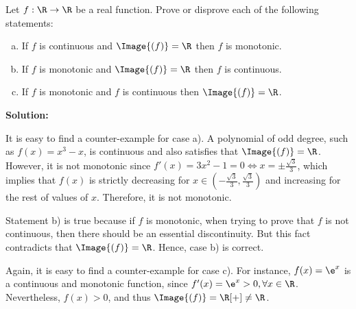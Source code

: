 \documentclass[../../main.tex]{subfiles}
\begin{document}
  \begin{shaded}
    Let $f: \R \to \R$ be a real function. Prove or disprove each of the following statements:

    \begin{enumerate}[a)]
      \item If $f$ is continuous and $\Image{(f)} = \R$ then $f$ is monotonic.
      \item If $f$ is monotonic and $\Image{(f)} = \R$ then $f$ is continuous.
      \item If $f$ is monotonic and $f$ is continuous then $\Image{(f)} = \R$.
    \end{enumerate}
  \end{shaded}

  \textbf{Solution:}

  It is easy to find a counter-example for case a). A polynomial of odd degree, such as $f(x) = x^3 - x$, is continuous and also satisfies that $\Image{(f)} = \R$. However, it is not monotonic since $f'(x) = 3x^2 - 1 = 0 \iff x = \pm \displaystyle\frac{\sqrt{3}}{3}$, which implies that $f(x)$ is strictly decreasing for $x \in \left(-\displaystyle\frac{\sqrt{3}}{3}, \displaystyle\frac{\sqrt{3}}{3}\right)$ and increasing for the rest of values of $x$. Therefore, it is not monotonic.

  Statement b) is true because if $f$ is monotonic, when trying to prove that $f$ is not continuous, then there should be an essential discontinuity. But this fact contradicts that $\Image{(f)} = \R$. Hence, case b) is correct.

  Again, it is easy to find a counter-example for case c). For instance, $f(x) = \e^x$ is a continuous and monotonic function, since $f'(x) = \e^x > 0, \forall x \in \R$. Nevertheless, $f(x) > 0$, and thus $\Image{(f)} = \R[+] \ne \R$.
\end{document}
